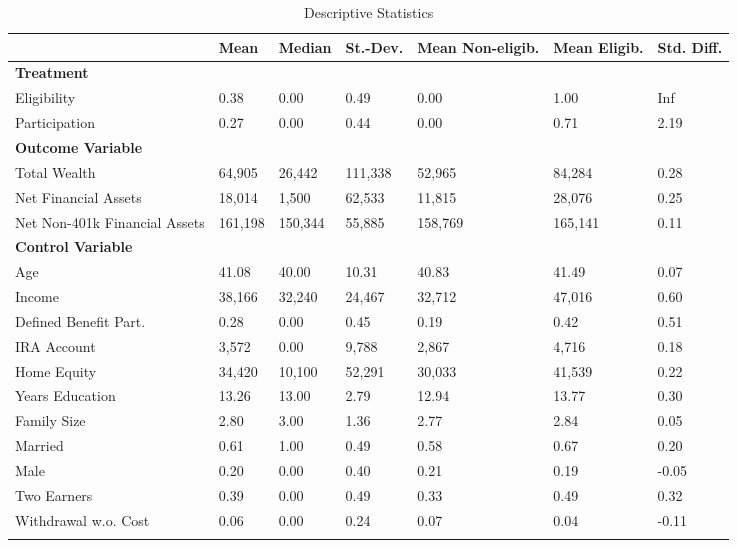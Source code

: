 \begin{tiny}
\begin{ThreePartTable}
				\begin{longtable}{l C{1.45cm} C{1.45cm} C{1.45cm} C{1.45cm}C{1.45cm} C{1.45cm}}
					\caption{Descriptive Statistics}\label{tab_descriptives}\\
					\toprule
					 & Mean & Median & St.-Dev. & Mean Non-eligib. & Mean Eligib. & Std. Diff.\\ 
					\midrule
					\textbf{Treatment} & & & & & & \\
					Eligibility & 0.38 & 0.00 & 0.49 & 0.00 & 1.00 & Inf \\ 
  Participation & 0.27 & 0.00 & 0.44 & 0.00 & 0.71 & 2.19 \\ 
  					\midrule
					\textbf{Outcome Variable} & & & & & & \\
					 Total Wealth & 64,905 & 26,442 & 111,338 & 52,965 & 84,284 & 0.28 \\ 
  Net Financial Assets & 18,014 & 1,500 & 62,533 & 11,815 & 28,076 & 0.25 \\ 
  Net Non-401k Financial Assets & 161,198 & 150,344 & 55,885 & 158,769 & 165,141 & 0.11 \\ 
					\midrule
					\textbf{Control Variable}  & & & & & & \\
				  Age & 41.08 & 40.00 & 10.31 & 40.83 & 41.49 & 0.07 \\ 
Income & 38,166 & 32,240 & 24,467 & 32,712 & 47,016 & 0.60 \\ 
  Defined Benefit Part. & 0.28 & 0.00 & 0.45 & 0.19 & 0.42 & 0.51 \\ 
  IRA Account& 3,572 & 0.00 & 9,788 & 2,867 & 4,716 & 0.18 \\ 
  Home Equity & 34,420 & 10,100 & 52,291 & 30,033 & 41,539 & 0.22\\
  Years Education & 13.26 & 13.00 & 2.79 & 12.94 & 13.77 & 0.30 \\ 
  Family Size & 2.80 & 3.00 & 1.36 & 2.77 & 2.84 & 0.05 \\ 
  Married & 0.61 & 1.00 & 0.49 & 0.58 & 0.67 & 0.20 \\ 
  Male & 0.20 & 0.00 & 0.40 & 0.21 & 0.19 & -0.05 \\ 
  Two Earners & 0.39 & 0.00 & 0.49 & 0.33 & 0.49 & 0.32 \\ 
   Withdrawal w.o. Cost & 0.06 & 0.00 & 0.24 & 0.07 & 0.04 & -0.11 \\ 

				\bottomrule
				\insertTableNotes \\
				\end{longtable} 

				
			\end{ThreePartTable}
	\end{tiny}
